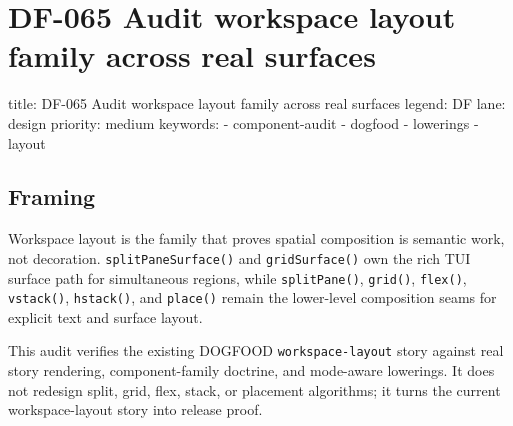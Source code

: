 \chapter{DF-065 Audit workspace layout family across real surfaces}\label{record-106}

\smallskip

\begin{RecordMeta}
title: DF-065 Audit workspace layout family across real surfaces
legend: DF
lane: design
priority: medium
keywords:
  - component-audit
  - dogfood
  - lowerings
  - layout

\end{RecordMeta}

\section{Framing}\label{record-106-framing}

Workspace layout is the family that proves spatial composition is semantic work, not decoration. \texttt{s\allowbreak{}p\allowbreak{}l\allowbreak{}i\allowbreak{}t\allowbreak{}P\allowbreak{}a\allowbreak{}n\allowbreak{}e\allowbreak{}S\allowbreak{}u\allowbreak{}r\allowbreak{}f\allowbreak{}a\allowbreak{}c\allowbreak{}e\allowbreak{}(\allowbreak{})} and \texttt{g\allowbreak{}r\allowbreak{}i\allowbreak{}d\allowbreak{}S\allowbreak{}u\allowbreak{}r\allowbreak{}f\allowbreak{}a\allowbreak{}c\allowbreak{}e\allowbreak{}(\allowbreak{})} own the rich TUI surface path for simultaneous regions, while \texttt{s\allowbreak{}p\allowbreak{}l\allowbreak{}i\allowbreak{}t\allowbreak{}P\allowbreak{}a\allowbreak{}n\allowbreak{}e\allowbreak{}(\allowbreak{})}, \texttt{g\allowbreak{}r\allowbreak{}i\allowbreak{}d\allowbreak{}(\allowbreak{})}, \texttt{f\allowbreak{}l\allowbreak{}e\allowbreak{}x\allowbreak{}(\allowbreak{})}, \texttt{v\allowbreak{}s\allowbreak{}t\allowbreak{}a\allowbreak{}c\allowbreak{}k\allowbreak{}(\allowbreak{})}, \texttt{h\allowbreak{}s\allowbreak{}t\allowbreak{}a\allowbreak{}c\allowbreak{}k\allowbreak{}(\allowbreak{})}, and \texttt{p\allowbreak{}l\allowbreak{}a\allowbreak{}c\allowbreak{}e\allowbreak{}(\allowbreak{})} remain the lower-level composition seams for explicit text and surface layout.

This audit verifies the existing DOGFOOD \texttt{w\allowbreak{}o\allowbreak{}r\allowbreak{}k\allowbreak{}s\allowbreak{}p\allowbreak{}a\allowbreak{}c\allowbreak{}e\allowbreak{}-\allowbreak{}l\allowbreak{}a\allowbreak{}y\allowbreak{}o\allowbreak{}u\allowbreak{}t} story against real story rendering, component-family doctrine, and mode-aware lowerings. It does not redesign split, grid, flex, stack, or placement algorithms; it turns the current workspace-layout story into release proof.

